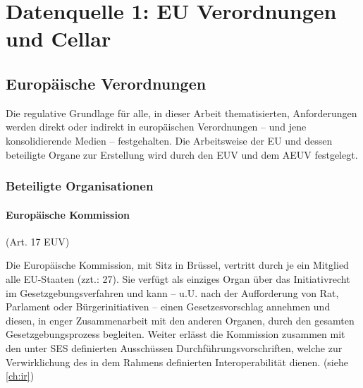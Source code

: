 \chapter{Datenquelle 1: EU Verordnungen und Cellar}


    \section{Europäische Verordnungen}


Die regulative Grundlage für alle, in dieser Arbeit thematisierten, Anforderungen werden direkt oder indirekt in europäischen Verordnungen -- und jene konsolidierende Medien -- festgehalten.
Die Arbeitsweise der EU und dessen beteiligte Organe zur Erstellung wird durch den \acf{EUV} und dem \acf{AEUV} festgelegt.
        
        \subsection{Beteiligte Organisationen}


\subsubsection{Europäische Kommission}

\begin{center}
    {\footnotesize(Art. 17 \ac{EUV})}
\end{center}

Die Europäische Kommission, mit Sitz in Brüssel, vertritt durch je ein Mitglied alle EU-Staaten (zzt.: 27). 
Sie verfügt als einziges Organ über das Initiativrecht im Gesetzgebungsverfahren und kann – u.U. nach der Aufforderung von Rat, Parlament oder Bürgerinitiativen – einen Gesetzesvorschlag annehmen und diesen, in enger Zusammenarbeit mit den anderen Organen, durch den gesamten Gesetzgebungsprozess begleiten.
\cite[Art. 17]{EUV}
Weiter erlässt die Kommission zusammen mit den unter \ac{SES} definierten Ausschüssen Durchführungsvorschriften, welche zur Verwirklichung des in dem Rahmens definierten Interoperabilität dienen. (siehe \ref{ch:ir})

